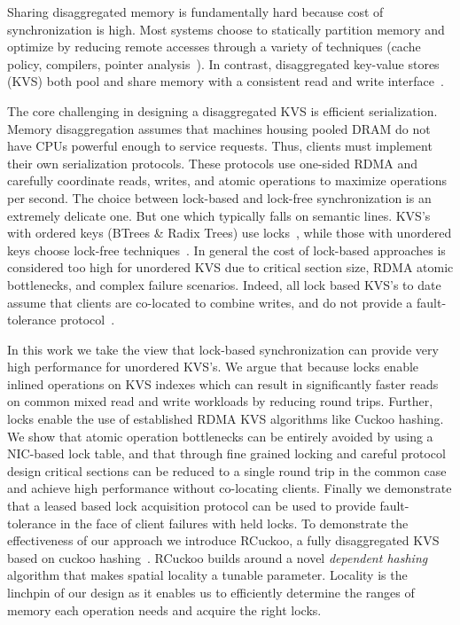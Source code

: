Sharing disaggregated memory is fundamentally hard because cost of synchronization is high.  Most
systems choose to statically partition memory and optimize by reducing remote accesses through a
variety of techniques (cache policy, compilers, pointer
analysis~\cite{kona,mira,aifm,trackfm,carbink}). In contrast, disaggregated key-value stores (KVS)
both pool and share memory with a consistent read and write
interface~\cite{rolex,smart,ditto,fusee,clover,sherman,ford}.

The core challenging in designing a disaggregated KVS is efficient serialization. Memory
disaggregation assumes that machines housing pooled DRAM do not have CPUs powerful enough to service
requests. Thus, clients must implement their own serialization protocols. These protocols use
one-sided RDMA and carefully coordinate reads, writes, and atomic operations to maximize operations
per second.  The choice between lock-based and lock-free synchronization is an extremely delicate
one. But one which typically falls on semantic lines. KVS's with ordered keys (BTrees \& Radix
Trees) use locks~\cite{sherman,smart}, while those with unordered keys choose lock-free
techniques~\cite{rolex,ditto,fusee,clover}. In general the cost of lock-based approaches is
considered too high for unordered KVS due to critical section size, RDMA atomic bottlenecks, and
complex failure scenarios. Indeed, all lock based KVS's to date assume that clients are co-located
to combine writes, and do not provide a fault-tolerance protocol~\cite{sherman,smart}.

In this work we take the view that lock-based synchronization can provide very high performance for
unordered KVS's. We argue that because locks enable inlined operations on KVS indexes which can
result in significantly faster reads on common mixed read and write workloads by reducing round
trips. Further, locks enable the use of established RDMA KVS algorithms like Cuckoo hashing. We show
that atomic operation bottlenecks can be entirely avoided by using a NIC-based lock table, and that
through fine grained locking and careful protocol design critical sections can be reduced to a
single round trip in the common case and achieve high performance without co-locating clients.
Finally we demonstrate that a leased based lock acquisition protocol can be used to provide
fault-tolerance in the face of client failures with held locks.  To demonstrate the effectiveness of
our approach we introduce RCuckoo, a fully disaggregated KVS based on cuckoo hashing~\cite{cuckoo}.
RCuckoo builds around a novel \emph{dependent hashing} algorithm that makes spatial locality a
tunable parameter. Locality is the linchpin of our design as it enables us to efficiently determine
the ranges of memory each operation needs and acquire the right locks.



